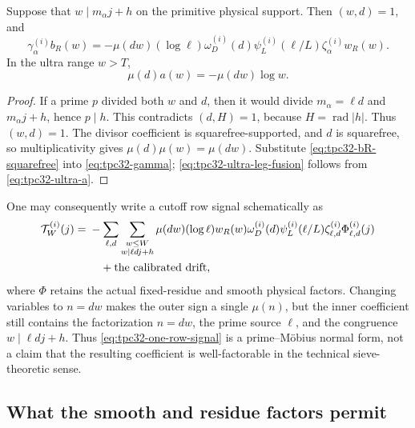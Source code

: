 \begin{lemma}
\label{lem:tpc32-leg-fusion}
Suppose that $w\mid m_\alpha j+h$ on the primitive physical support.
Then $(w,d)=1$, and
\begin{equation}
 \boxed{
 \gamma_\alpha^{(i)}b_R(w)
 =-\mu(dw)(\log\ell)\omega_D^{(i)}(d)
   \psi_L^{(i)}(\ell/L)\zeta_\alpha^{(i)}w_R(w).}
 \label{eq:tpc32-leg-fusion}
\end{equation}
In the ultra range $w>T$,
\begin{equation}
 \mu(d)a(w)=-\mu(dw)\log w.
 \label{eq:tpc32-ultra-leg-fusion}
\end{equation}
\end{lemma}

\begin{proof}
If a prime $p$ divided both $w$ and $d$, then it would divide
$m_\alpha=\ell d$ and $m_\alpha j+h$, hence $p\mid h$.  This contradicts
$(d,H)=1$, because $H=\operatorname{rad}|h|$.  Thus $(w,d)=1$.
The divisor coefficient is squarefree-supported, and $d$ is squarefree, so
multiplicativity gives $\mu(d)\mu(w)=\mu(dw)$.  Substitute
\eqref{eq:tpc32-bR-squarefree} into \eqref{eq:tpc32-gamma};
\eqref{eq:tpc32-ultra-leg-fusion} follows from
\eqref{eq:tpc32-ultra-a}.
\end{proof}

One may consequently write a cutoff row signal schematically as
\begin{align}
 \mathcal T_W^{(i)}(j)
 ={}&-\sum_{\ell,d}\sum_{\substack{w\le W\\w\mid\ell dj+h}}
 \mu(dw)(\log\ell)w_R(w)
 \omega_D^{(i)}(d)\psi_L^{(i)}(\ell/L)
 \zeta_{\ell,d}^{(i)}\Phi_{\ell,d}^{(i)}(j)
 \notag\\
 &\quad+\text{the calibrated drift},
 \label{eq:tpc32-one-row-signal}
\end{align}
where $\Phi$ retains the actual fixed-residue and smooth physical factors.
Changing variables to $n=dw$ makes the outer sign a single $\mu(n)$, but
the inner coefficient still contains the factorization $n=dw$, the prime
source $\ell$, and the congruence $w\mid\ell dj+h$.  Thus
\eqref{eq:tpc32-one-row-signal} is a prime--M\"obius normal form, not a
claim that the resulting coefficient is well-factorable in the technical
sieve-theoretic sense.

\subsection{What the smooth and residue factors permit}

